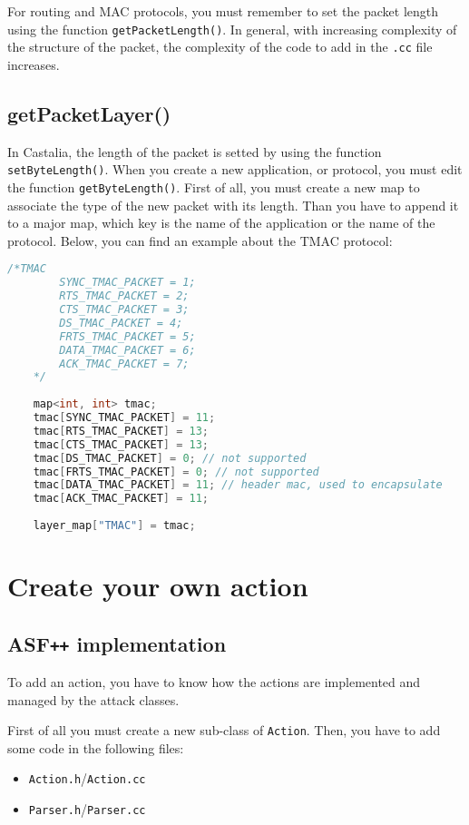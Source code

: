For routing and MAC protocols, you must remember to set the packet length using the function \texttt{getPacketLength()}. In general, with increasing  complexity of the structure of the packet, the complexity of the code to add in the \texttt{.cc} file increases.



\subsection{getPacketLayer()}
In Castalia, the length of the packet is setted by using the function \texttt{setByteLength()}. When you create a new application, or protocol, you must edit the function \texttt{getByteLength()}. First of all, you must create a new map to associate the type of the new packet with its length.
Than you have to append it to a major map, which key is the name of the application or the name of the protocol. Below, you can find an example about the TMAC protocol:
%
\begin{lstlisting}[language={cpp}]
	/*TMAC 
		SYNC_TMAC_PACKET = 1;
		RTS_TMAC_PACKET = 2;
		CTS_TMAC_PACKET = 3;
		DS_TMAC_PACKET = 4;
		FRTS_TMAC_PACKET = 5;
		DATA_TMAC_PACKET = 6;
		ACK_TMAC_PACKET = 7;
	*/
	
	map<int, int> tmac;
	tmac[SYNC_TMAC_PACKET] = 11;
	tmac[RTS_TMAC_PACKET] = 13;
	tmac[CTS_TMAC_PACKET] = 13;
	tmac[DS_TMAC_PACKET] = 0; // not supported
	tmac[FRTS_TMAC_PACKET] = 0; // not supported
	tmac[DATA_TMAC_PACKET] = 11; // header mac, used to encapsulate
	tmac[ACK_TMAC_PACKET] = 11;
	
	layer_map["TMAC"] = tmac;
\end{lstlisting}



\section{Create your own action}
\subsection{ASF\texttt{++} implementation}
To add an action, you have to know how the actions are implemented and managed by the attack classes.

First of all you must create a new sub-class of \texttt{Action}. Then, you have to add some code in the following files:
%
\begin{itemize}
\item \texttt{Action.h}/\texttt{Action.cc}
\item \texttt{Parser.h}/\texttt{Parser.cc}
\end{itemize}

